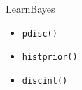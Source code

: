 
LearnBayes

\begin{itemize}
\item \texttt{pdisc()}
\item \texttt{histprior()}
\item \texttt{discint()}
\end{itemize}
